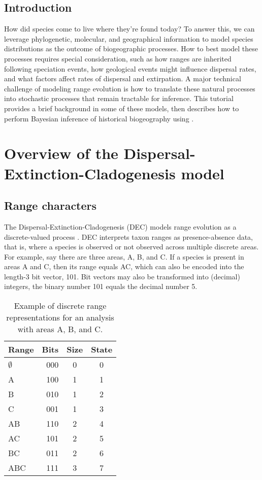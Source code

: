 \subsection*{Introduction}

How did species come to live where they're found today?
To answer this, we can leverage phylogenetic, molecular, and geographical information to model species distributions as the outcome of biogeographic processes.
How to best model these processes requires special consideration, such as how ranges are inherited following speciation events, how geological events might influence dispersal rates, and what factors affect rates of dispersal and extirpation.
A major technical challenge of modeling range evolution is how to translate these natural processes into stochastic processes that remain tractable for inference.
This tutorial provides a brief background in some of these models, then describes how to perform Bayesian inference of historical biogeography using \RevBayes.

\section{Overview of the Dispersal-Extinction-Cladogenesis model}

\subsection*{Range characters}

The Dispersal-Extinction-Cladogenesis (DEC) models range evolution as a discrete-valued process \citep{ree05, ree08}.
DEC interprets taxon ranges as presence-absence data, that is, where a species is observed or not observed across multiple discrete areas.
For example, say there are three areas, A, B, and C.
If a species is present in areas A and C, then its range equals AC, which can also be encoded into the length-3 bit vector, 101.
Bit vectors may also be transformed into (decimal) integers, \EG the binary number 101 equals the decimal number 5.

\begin{table}[!ht]
\centering
\begin{tabular}{lrcc}
Range & Bits & Size & State \\ \hline
$\emptyset$ & 000 & 0 & 0 \\
          A & 100 & 1 & 1 \\
          B & 010 & 1 & 2 \\
          C & 001 & 1 & 3 \\
         AB & 110 & 2 & 4 \\
         AC & 101 & 2 & 5 \\
         BC & 011 & 2 & 6 \\
        ABC & 111 & 3 & 7 \\
\end{tabular}
\caption{Example of discrete range representations for an analysis with areas A, B, and C.}
\end{table}

